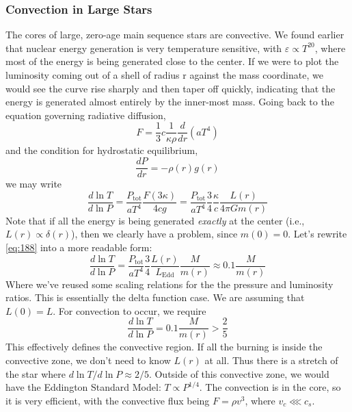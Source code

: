 \documentclass[10pt]{article}
\numberwithin{equation}{section}
\begin{document}
    \subsubsection{Convection in Large Stars}
    \label{sec:conv-large-stars}

    The cores of large, zero-age main sequence stars are
    convective. We found earlier that nuclear energy generation is very
    temperature sensitive, with $\varepsilon\propto T^{20}$, where
    most of the energy is being generated close to the center. If we
    were to plot the luminosity coming out of a shell of radius r
    against the mass coordinate, we would see the curve rise sharply
    and then taper off quickly, indicating that the energy is
    generated almost entirely by the inner-most mass. Going back to
    the equation governing radiative diffusion, 
    \begin{equation}
      \label{eq:187}
      F=\frac{1}{3}c\frac{1}{\kappa\rho}\frac{d}{dr}\left(aT^4\right)
    \end{equation}
    and the condition for hydrostatic equilibrium,
    \begin{equation}
      \label{eq:189}
      \frac{dP}{dr}=-\rho(r)g(r)
    \end{equation}
    we may write
    \begin{equation}
      \label{eq:188}
      \frac{d\ln T}{d\ln
        P}=\frac{P_{\mathrm{tot}}}{aT^4}\frac{F(3\kappa)}{4c
        g}=\frac{P_{\mathrm{tot}}}{aT^4}\frac{3}{4}\frac{\kappa}{c}\frac{L
(r)}{4\pi Gm(r)}
    \end{equation}
    Note that if all the energy is being generated \emph{exactly} at
    the center (i.e., $L(r)\propto \delta(r)$), then we clearly have a
    problem, since $m(0)=0$. Let's rewrite \eqref{eq:188} into a more
    readable form:
    \begin{equation}
      \label{eq:190}
      \frac{d\ln T}{d\ln
        P}=\frac{P_{\mathrm{tot}}}{aT^4}\frac{3}{4}\frac{L(r)}{L_{\mathrm
{Edd}}}\frac{M}{m(r)}\approx
      0.1\frac{M}{m(r)}
    \end{equation}
    Where we've reused some scaling relations for the the pressure and
    luminosity ratios. This is essentially the delta function case. We
    are assuming that $L(0)=L$. For convection to occur, we require
    \begin{equation}
      \label{eq:191}
      \frac{d\ln T}{d\ln P}=0.1\frac{M}{m(r)}>\frac{2}{5}
    \end{equation}
    This effectively defines the convective region. If all the burning
    is inside the convective zone, we don't need to know $L(r)$ at
    all. Thus there is a stretch of the star where $d\ln T/d\ln P
    \approx 2/5$. Outside of this convective zone, we would have
    the Eddington Standard Model: $T\propto P^{1/4}$. The convection
    is in the core, so it is very efficient, with the convective flux
    being $F=\rho v^3$, where $v_c\lll c_s$.\\
\end{document}
